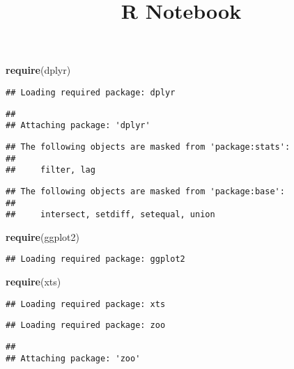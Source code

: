 \documentclass[]{article}
\title{R Notebook}
\author{}
\date{\vspace{-2.5em}}
\newenvironment{Shaded}{\begin{snugshade}}{\end{snugshade}}
\newcommand{\KeywordTok}[1]{\textcolor[rgb]{0.13,0.29,0.53}{\textbf{#1}}}
\newcommand{\NormalTok}[1]{#1}
\begin{document}
\maketitle

\begin{Shaded}
\begin{Highlighting}[]
\KeywordTok{require}\NormalTok{(dplyr)}
\end{Highlighting}
\end{Shaded}

\begin{verbatim}
## Loading required package: dplyr
\end{verbatim}

\begin{verbatim}
## 
## Attaching package: 'dplyr'
\end{verbatim}

\begin{verbatim}
## The following objects are masked from 'package:stats':
## 
##     filter, lag
\end{verbatim}

\begin{verbatim}
## The following objects are masked from 'package:base':
## 
##     intersect, setdiff, setequal, union
\end{verbatim}

\begin{Shaded}
\begin{Highlighting}[]
\KeywordTok{require}\NormalTok{(ggplot2)}
\end{Highlighting}
\end{Shaded}

\begin{verbatim}
## Loading required package: ggplot2
\end{verbatim}

\begin{Shaded}
\begin{Highlighting}[]
\KeywordTok{require}\NormalTok{(xts)}
\end{Highlighting}
\end{Shaded}

\begin{verbatim}
## Loading required package: xts
\end{verbatim}

\begin{verbatim}
## Loading required package: zoo
\end{verbatim}

\begin{verbatim}
## 
## Attaching package: 'zoo'
\end{verbatim}
\end{document}
